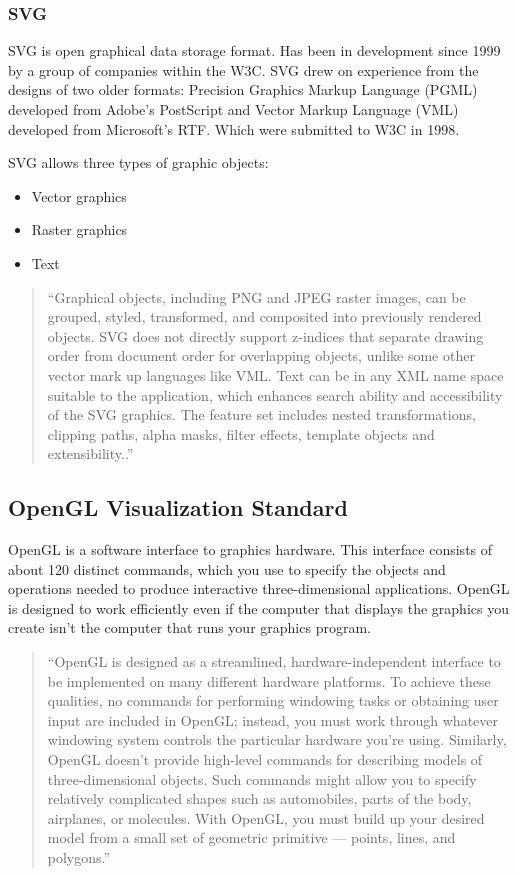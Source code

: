 \subsubsection{SVG}
SVG is open graphical data storage format. Has been in development since 1999 by a group of companies within the W3C.
SVG drew on experience from the designs of two older formats: Precision Graphics Markup Language (PGML) developed from Adobe's PostScript and Vector Markup Language (VML) developed from Microsoft's RTF. Which were submitted to W3C in 1998.


SVG allows three types of graphic objects:
\begin{itemize}
\item Vector graphics
\item Raster graphics
\item Text
\end{itemize}

\begin{quotation}
``Graphical objects, including PNG and JPEG raster images, can be grouped, styled, transformed,
and composited into previously rendered objects. SVG does not directly support z-indices
that separate drawing order from document order for overlapping objects, unlike some other vector mark up languages like VML.
Text can be in any XML name space suitable to the application, which enhances search ability and accessibility of the SVG graphics.
The feature set includes nested transformations, clipping paths, alpha masks, filter effects, template objects and extensibility..''~\cite{SVG}
\end{quotation}

\subsection{OpenGL Visualization Standard}
\label{sec:opengl}
OpenGL is a software interface to graphics hardware. This interface consists of about 120 distinct commands, which you use to specify the objects and operations needed to produce interactive three-dimensional applications. OpenGL is designed to work efficiently even if the computer that displays the graphics you create isn't the computer that runs your graphics program. 

\begin{quotation}
``OpenGL is designed as a streamlined, hardware-independent interface to be implemented on many different hardware platforms.
To achieve these qualities, no commands for performing windowing tasks or obtaining user input are included in OpenGL;
instead, you must work through whatever windowing system controls the particular hardware you're using.
Similarly, OpenGL doesn't provide high-level commands for describing models of three-dimensional objects.
Such commands might allow you to specify relatively complicated shapes such as automobiles, parts of the body, airplanes,
or molecules. With OpenGL, you must build up your desired model from a small set of geometric primitive --- points,
lines, and polygons.''~\cite{THE_RED_BOOK}
\end{quotation}

